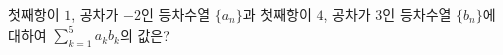 첫째항이 $1$, 공차가 $-2$인 등차수열 $\{a_n\}$과 첫째항이 $4$, 공차가 $3$인 등차수열 $\{b_n\}$에 대하여 $\displaystyle\sum_{k=1}^{5} a_k b_k$의 값은?
